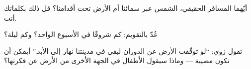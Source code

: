 \begin{exercise}[$\star$]\label{exo:g1:day-and-night:7}
أيّهما المسافر الحقيقي، الشمس عبر سمائنا أم الأرض تحت أقدامنا؟
قل ذلك بكلماتك أنت.
\end{exercise}

\begin{exercise}[$\star$]\label{exo:g1:day-and-night:8}
عُدّ بالتقويم: كم شروقًا في الأسبوع الواحد؟ وكم ليلة؟
\end{exercise}

\begin{exercise}[$\star\star$]\label{exo:g1:day-and-night:9}
تقول زوي: ``لو توقّفت الأرض عن الدوران لبقي في مدينتنا نهار إلى
الأبد.'' أيمكن أن تكون مصيبة --- وماذا سيقول الأطفال في الجهة
الأخرى من الأرض عن فكرتها؟
\end{exercise}
